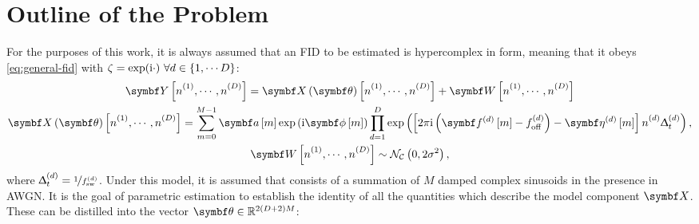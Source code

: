 \section{Outline of the Problem}
\label{sec:theory-outline}
For the purposes of this work, it is always assumed that an \ac{FID} to be
estimated is hypercomplex in form, meaning that it obeys
\eqref{eq:general-fid} with $\zeta = \exp(\mathrm{i} \cdot)\ \forall d \in \lbrace 1,
\cdots D \rbrace$:
\begin{subequations}
    \begin{gather}
        \bY \left[\none, \cdots, \nD\right] =
            \bX \left( \bth \right) \left[\none, \cdots, \nD\right] +
            \bW \left[\none, \cdots, \nD\right] \\
        \bX \left(\bth\right) \left[\none, \cdots, \nD\right] =
        \sum_{m=0}^{M-1} \bdam \exp\left(
                \iu \bdphim
            \right)
            \prod_{d=1}^D
            \exp\left(
                \left[ 2 \pi \iu \left(\bdfdm - \foffd\right) - \bdetadm \right] \nd \Dtd
            \right),
            \label{eq:x}
            \\
        \bW \left[\none, \cdots, \nD\right] \sim
            \mathcal{N_C}\left(0, 2\sigma^2\right),
    \end{gather}
\end{subequations}%
where $\Updelta_t^{(d)} = \nicefrac{1}{f_{\mathrm{sw}}^{(d)}}$. Under this model, it is assumed that
 consists of a summation of $M$ damped complex sinusoids in the
presence in \ac{AWGN}. It is the goal of parametric estimation to establish the
identity of all the quantities which describe the model component $\bX$. These
can be distilled into the vector $\bth \in \mathbb{R}^{2(D + 2)M}$:

